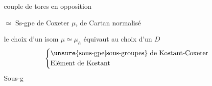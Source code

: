 couple de tores  en opposition

$\simeq$ Ss-gpe de Coxeter $\mu$,  de Cartan normalisé

 le choix d'un isom $\mu\simeq\mu_h$ équivaut au choix d'un $D$ \unsure{\ldots|---}
\[
\left\{\begin{aligned}
&\text{\unsure{sous-gpe|sous-groupes} de Kostant-Coxeter}\\
&\text{Elément de Kostant}
\end{aligned}\right.
\]
Sous-g

